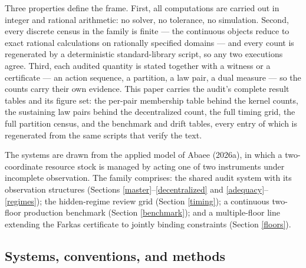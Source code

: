 \documentclass[10pt,twocolumn]{article}
\theoremstyle{definition}
\begin{document}
Three properties define the frame. First, all computations are carried
out in integer and rational arithmetic: no solver, no tolerance, no
simulation. Second, every discrete census in the family is finite --- the continuous objects reduce to exact rational calculations on rationally specified domains --- and every count is regenerated by a deterministic standard-library script, so any two executions agree. Third, each audited quantity is stated together with a
witness or a certificate --- an action sequence, a partition, a law
pair, a dual measure --- so the counts carry their own evidence. This paper carries the audit's complete result tables and its figure set:
the per-pair membership table behind the kernel counts, the sustaining
law pairs behind the decentralized count, the full timing grid, the full
partition census, and the benchmark and drift tables, every entry of
which is regenerated from the same scripts that verify the text.

The systems are drawn from the applied model of Abaee (2026a), in which
a two-coordinate resource stock is managed by acting one of two
instruments under incomplete observation. The family comprises: the
shared audit system with its observation structures (Sections
\ref{master}--\ref{decentralized} and \ref{adequacy}--\ref{regimes});
the hidden-regime review grid (Section
\ref{timing}); a continuous two-floor production benchmark (Section
\ref{benchmark}); and a multiple-floor line extending the Farkas
certificate to jointly binding constraints (Section \ref{floors}).

\subsection{Systems, conventions, and methods}\label{frame}
\end{document}
